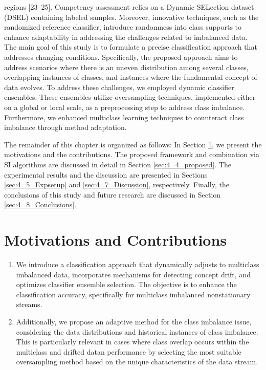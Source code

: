 regions [23–25]. Competency assessment relies on a Dynamic SELection dataset (DSEL) containing labeled samples. Moreover,
innovative techniques, such as the randomized reference classifier, introduce randomness into class supports to enhance adaptability
in addressing the challenges related to imbalanced data.
The main goal of this study is to formulate a precise classification approach that addresses changing conditions. Specifically, the
proposed approach aims to address scenarios where there is an uneven distribution among several classes, overlapping instances of
classes, and instances where the fundamental concept of data evolves. To address these challenges, we employed dynamic classifier
ensembles. These ensembles utilize oversampling techniques, implemented either on a global or local scale, as a preprocessing step to
address class imbalance. Furthermore, we enhanced multiclass learning techniques to counteract class imbalance through method
adaptation. 

The remainder of this chapter is organized as follows: In Section \ref{sec:4_2_motivation}, we present the motivations and the contributions. The proposed framework and combination via SI algorithms are discussed in detail in Section \ref{sec:4_4_proposed}. The  experimental results and the discussion are presented in Sections \ref{sec:4_5_Expsetup} and \ref{sec:4_7_Discussion}, respectively. Finally, the conclusions of this study and future research are discussed in Section \ref{sec:4_8_Conclusions}. 


\section{Motivations and Contributions} \label{sec:4_2_motivation}
\begin{enumerate}[nosep]
  \item We introduce a classification approach that dynamically adjusts to multiclass imbalanced data, incorporates mechanisms for
  detecting concept drift, and optimizes classifier ensemble selection. The objective is to enhance the classification accuracy, specifically for multiclass imbalanced nonstationary streams.
 \item Additionally, we propose an adaptive method for the class imbalance issue, considering the data distributions and historical instances of class imbalance. This is particularly relevant in cases where class overlap occurs within the multiclass and drifted datan performance by selecting the most suitable oversampling method based on the unique characteristics of the data stream. 
  \end{enumerate} 
 
   

